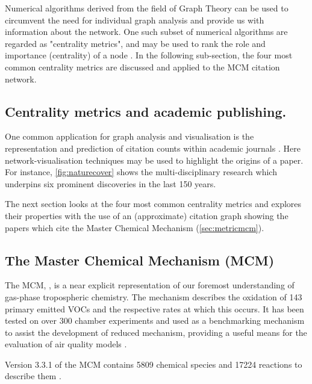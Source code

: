 Numerical algorithms derived from the field of Graph Theory can be used to circumvent the need for individual graph analysis and provide us with information about the network. One such subset of numerical algorithms are regarded as "centrality metrics", and may be used to rank the role and importance (centrality) of a node \citep{squaretower}. In the following sub-section, the four most common centrality metrics are discussed and applied to the MCM citation network. 


\subsection{Centrality metrics and academic publishing.}


One common application for graph analysis and visualisation is the representation and prediction of citation counts within academic journals \citep{cocite,google,naturecitation,netcoauthor}. Here network-visualisation techniques may be used to highlight the origins of a paper. For instance, \autoref{fig:naturecover} shows the multi-disciplinary research which underpins six prominent discoveries in the last 150 years. 

The next section looks at the four most common centrality metrics and explores their properties with the use of an (approximate) citation graph showing the papers which cite the Master Chemical Mechanism (\autoref{sec:metricmcm}).



\subsection{The Master Chemical Mechanism (MCM)}\label{sec:metricmcm}

The MCM, \citep{mcm}, is a near explicit representation of our foremost understanding of gas-phase tropospheric chemistry. The mechanism describes the oxidation of 143 primary emitted VOCs and the respective rates at which this occurs. It has been tested on over 300 chamber experiments and used as a benchmarking mechanism to assist the development of reduced mechanism, providing a useful means for the evaluation of air quality models \citep{defra1}.

Version 3.3.1 of the MCM contains 5809 chemical species and 17224 reactions to describe them \citep{isopmcm}.




